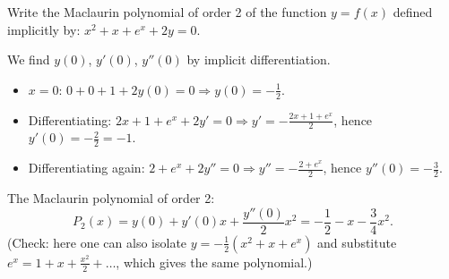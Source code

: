 
\begin{question}
Write the Maclaurin polynomial of order 2 of the function $y=f(x)$ defined implicitly by: $x^2+x+e^x+2y=0$.
\end{question}

\begin{solution}
We find $y(0)$, $y'(0)$, $y''(0)$ by implicit differentiation.
\begin{itemize}
  \item $x=0$: $0+0+1+2y(0)=0\Rightarrow y(0)=-\frac12$.
  \item Differentiating: $2x+1+e^x+2y'=0\Rightarrow y'=-\frac{2x+1+e^x}{2}$, hence $y'(0)=-\frac{2}{2}=-1$.
  \item Differentiating again: $2+e^x+2y''=0\Rightarrow y''=-\frac{2+e^x}{2}$, hence $y''(0)=-\frac32$.
\end{itemize}
The Maclaurin polynomial of order 2:
\[ P_2(x)=y(0)+y'(0)x+\frac{y''(0)}{2}x^2=\boxed{-\frac12-x-\frac34x^2}. \]
(Check: here one can also isolate $y=-\frac12(x^2+x+e^x)$ and substitute $e^x=1+x+\frac{x^2}{2}+\dots$, which gives the same polynomial.)
\end{solution}
